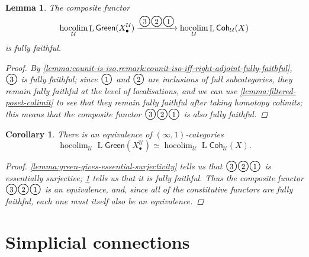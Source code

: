 \documentclass[11pt,fleqn]{article}
\theoremstyle{plain}
\newtheorem{lemma}[theorem]{Lemma}
\newtheorem{corollary}[theorem]{Corollary}
\theoremstyle{definition}
\theoremstyle{remark}
\numberwithin{equation}{theorem}
\newcommand{\cover}{\mathcal{U}}
\newcommand{\gcohUX}{\mathsf{Coh}_{\cover}(X)}
\newcommand{\greenX}{\mathsf{Green}(X_\bullet^\cover)}
\newcommand{\numberincircle}[1]{\text{\normalfont\Large\textcircled{\small #1}}}
\DeclareMathOperator{\LL}{L}
\DeclareMathOperator{\hocolim}{hocolim}
\begin{document}
        \begin{lemma}\label{lemma:green-gives-fully-faithful}
            The composite functor
            \begin{equation*}
                \hocolim_\cover\LL{\greenX}
                \xrightarrow{\numberincircle{3}\numberincircle{2}\numberincircle{1}}
                \hocolim_\cover\LL{\gcohUX}
            \end{equation*}
            is fully faithful.
            \begin{proof}
                By \cref{lemma:counit-is-iso,remark:counit-iso-iff-right-adjoint-fully-faithful}, $\numberincircle{3}$ is fully faithful; since $\numberincircle{1}$ and $\numberincircle{2}$ are inclusions of full subcategories, they remain fully faithful at the level of localisations, and we can use \cref{lemma:filtered-poset-colimit} to see that they remain fully faithful after taking homotopy colimits; this means that the composite functor $\numberincircle{3}\numberincircle{2}\numberincircle{1}$ is also fully faithful.
            \end{proof}
        \end{lemma}

        \begin{corollary}
        \label{corollary:equivalence-without-connections}
            There is an equivalence of $(\infty,1)$-categories
            \begin{equation*}
                \hocolim_\cover\LL{\greenX} \simeq \hocolim_\cover\LL{\gcohUX}.
            \end{equation*}
            \begin{proof}
                \cref{lemma:green-gives-essential-surjectivity} tells us that $\numberincircle{3}\numberincircle{2}\numberincircle{1}$ is essentially surjective; \cref{lemma:green-gives-fully-faithful} tells us that it is fully faithful.
                Thus the composite functor $\numberincircle{3}\numberincircle{2}\numberincircle{1}$ is an equivalence, and, since all of the constitutive functors are fully faithful, each one must itself also be an equivalence.
            \end{proof}
        \end{corollary}




\section{Simplicial connections}\label{section:simplicial-connections}
\end{document}
